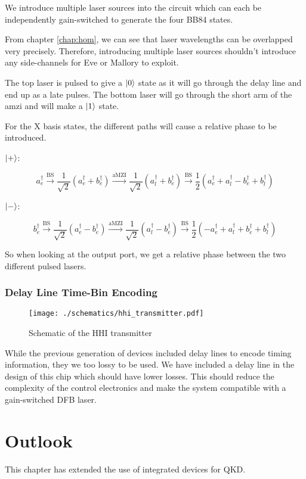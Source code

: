 We introduce multiple laser sources into the circuit which can each be independently gain-switched to generate the four BB84 states. 

From chapter \ref{chap:hom}, we can see that laser wavelengths can be overlapped very precisely. Therefore, introducing multiple laser sources shouldn't introduce any side-channels for Eve or Mallory to exploit.

The top laser is pulsed to give a $\ket{0}$ state as it will go through the delay line and end up as a late pulses. The bottom laser will go through the short arm of the \ac{amzi} and will make a $\ket{1}$ state.

For the X basis states, the different paths will cause a relative phase to be introduced.

$\ket{+}$:

\begin{equation}
	a^\dagger_e \xrightarrow{\text{BS}} \frac{1}{\sqrt{2}} (a^\dagger_e + b^\dagger_e) \xrightarrow{\text{aMZI}} \frac{1}{\sqrt{2}} (a^\dagger_l + b^\dagger_e) \xrightarrow{\text{BS}} \frac{1}{2}(a^\dagger_e + a^\dagger_l - b^\dagger_e + b^\dagger_l)
\end{equation}

$\ket{-}$:

\begin{equation}
	b^\dagger_e \xrightarrow{\text{BS}} \frac{1}{\sqrt{2}} (a^\dagger_e - b^\dagger_e) \xrightarrow{\text{aMZI}} \frac{1}{\sqrt{2}} (a^\dagger_l - b^\dagger_e) \xrightarrow{\text{BS}} \frac{1}{2}(- a^\dagger_e + a^\dagger_l + b^\dagger_e + b^\dagger_l)
\end{equation}

So when looking at the output port, we get a relative phase between the two different pulsed lasers.

\subsubsection*{Delay Line Time-Bin Encoding}

\begin{sidewaysfigure}
	\centering
	\texttt{[image: ./schematics/hhi\_transmitter.pdf]}
	\caption[Schematic of the HHI full transmitter]{Schematic of the HHI transmitter}
	\label{fig:hhi_transmitter}
\end{sidewaysfigure}

While the previous generation of devices included delay lines to encode timing information, they we too lossy to be used. We have included a delay line in the design of this chip which should have lower losses. This should reduce the complexity of the control electronics and make the system compatible with a gain-switched DFB laser.

\section{Outlook}

This chapter has extended the use of integrated devices for \acl{QKD}.

